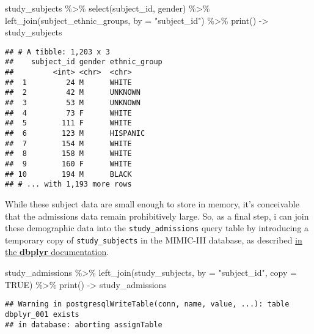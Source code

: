\documentclass[
]{article}
\newenvironment{Shaded}{\begin{snugshade}}{\end{snugshade}}
\newcommand{\AttributeTok}[1]{\textcolor[rgb]{0.77,0.63,0.00}{#1}}
\newcommand{\ConstantTok}[1]{\textcolor[rgb]{0.00,0.00,0.00}{#1}}
\newcommand{\FunctionTok}[1]{\textcolor[rgb]{0.00,0.00,0.00}{#1}}
\newcommand{\NormalTok}[1]{#1}
\newcommand{\OtherTok}[1]{\textcolor[rgb]{0.56,0.35,0.01}{#1}}
\newcommand{\SpecialCharTok}[1]{\textcolor[rgb]{0.00,0.00,0.00}{#1}}
\newcommand{\StringTok}[1]{\textcolor[rgb]{0.31,0.60,0.02}{#1}}
\begin{document}
\begin{Shaded}
\begin{Highlighting}[]
\NormalTok{study\_subjects }\SpecialCharTok{\%\textgreater{}\%}
  \FunctionTok{select}\NormalTok{(subject\_id, gender) }\SpecialCharTok{\%\textgreater{}\%}
  \FunctionTok{left\_join}\NormalTok{(subject\_ethnic\_groups, }\AttributeTok{by =} \StringTok{"subject\_id"}\NormalTok{) }\SpecialCharTok{\%\textgreater{}\%}
  \FunctionTok{print}\NormalTok{() }\OtherTok{{-}\textgreater{}}\NormalTok{ study\_subjects}
\end{Highlighting}
\end{Shaded}

\begin{verbatim}
## # A tibble: 1,203 x 3
##    subject_id gender ethnic_group
##         <int> <chr>  <chr>       
##  1         24 M      WHITE       
##  2         42 M      UNKNOWN     
##  3         53 M      UNKNOWN     
##  4         73 F      WHITE       
##  5        111 F      WHITE       
##  6        123 M      HISPANIC    
##  7        154 M      WHITE       
##  8        158 M      WHITE       
##  9        160 F      WHITE       
## 10        194 M      BLACK       
## # ... with 1,193 more rows
\end{verbatim}

While these subject data are small enough to store in memory, it's
conceivable that the admissions data remain prohibitively large. So, as
a final step, i can join these demographic data into the
\texttt{study\_admissions} query table by introducing a temporary copy
of \texttt{study\_subjects} in the MIMIC-III database, as described
\href{https://dbplyr.tidyverse.org/reference/join.tbl_sql.html}{in the
\textbf{dbplyr} documentation}.

\begin{Shaded}
\begin{Highlighting}[]
\NormalTok{study\_admissions }\SpecialCharTok{\%\textgreater{}\%}
  \FunctionTok{left\_join}\NormalTok{(study\_subjects, }\AttributeTok{by =} \StringTok{"subject\_id"}\NormalTok{, }\AttributeTok{copy =} \ConstantTok{TRUE}\NormalTok{) }\SpecialCharTok{\%\textgreater{}\%}
  \FunctionTok{print}\NormalTok{() }\OtherTok{{-}\textgreater{}}\NormalTok{ study\_admissions}
\end{Highlighting}
\end{Shaded}

\begin{verbatim}
## Warning in postgresqlWriteTable(conn, name, value, ...): table dbplyr_001 exists
## in database: aborting assignTable
\end{verbatim}
\end{document}
